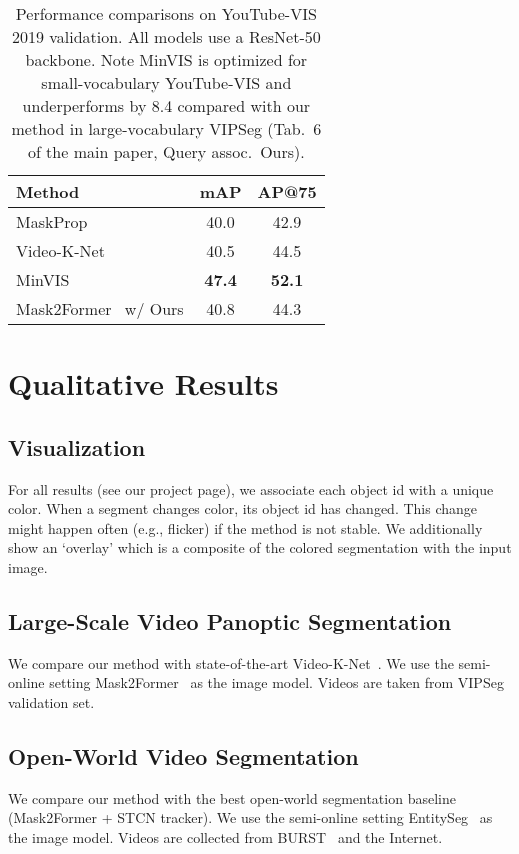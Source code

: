 \begin{table}[h]
    \centering
    \begin{tabular}{lcc}
    \toprule
    Method & mAP & AP@75\\
    \midrule
    MaskProp~\cite{bertasius2020classifying} & 40.0 & 42.9\\
    Video-K-Net~\cite{li2022video} & 40.5 & 44.5 \\
    MinVIS~\cite{huang2022minvis} & \textbf{47.4} & \textbf{52.1} \\
    Mask2Former~\cite{cheng2022masked} w/ Ours & 40.8 & 44.3 \\
    \midrule
    \bottomrule
    \end{tabular}
    \caption{Performance comparisons on YouTube-VIS 2019 validation. 
    All models use a ResNet-50 backbone.
    Note MinVIS is optimized for small-vocabulary YouTube-VIS and underperforms by 8.4  compared with our method in large-vocabulary VIPSeg (Tab.\ 6 of the main paper, Query assoc.\ \vs Ours).}
    \label{tab:app:youtubevis}
    \end{table}

\section{Qualitative Results}\label{sec:app:qualitive-details}
\subsection{Visualization}
For all results (see our project page), we associate each object id with a unique color. 
When a segment changes color, its object id has changed. 
This change might happen often (e.g., flicker) if the method is not stable.
We additionally show an `overlay' which is a composite of the colored segmentation with the input image.

\subsection{Large-Scale Video Panoptic Segmentation}
We compare our method with state-of-the-art Video-K-Net~\cite{li2022video}.
We use the semi-online setting Mask2Former~\cite{cheng2022masked} as the image model.
Videos are taken from VIPSeg~\cite{miao2022large} validation set.


\subsection{Open-World Video Segmentation}
We compare our method with the best open-world segmentation baseline (Mask2Former + STCN tracker).
We use the semi-online setting EntitySeg~\cite{qi2021open} as the image model.
Videos are collected from BURST~\cite{athar2023burst} and the Internet.


